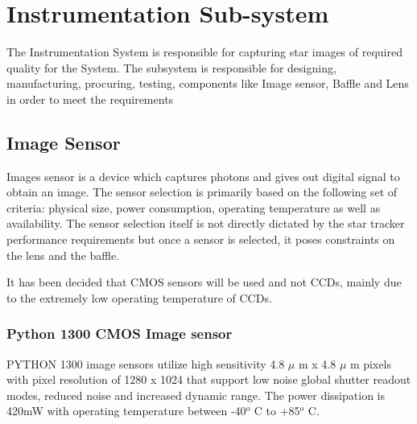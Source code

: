 \chapter{Instrumentation Sub-system}
\thispagestyle{fancy}

%
%
%
%




The Instrumentation System is responsible for capturing star images of required quality for the System. The subsystem is responsible for designing, manufacturing, procuring, testing, components like Image sensor, Baffle and Lens in order to meet the requirements 

\section{Image Sensor}
Images sensor is a device which captures photons and gives out digital signal to obtain an image.
The sensor selection is primarily based on the following set of criteria: physical size, power consumption, operating temperature as well as availability. The sensor selection itself is not directly dictated by the star tracker performance requirements but once a sensor is selected, it poses constraints on the lens and the baffle. \par It has been decided that CMOS sensors will be used and not CCDs, mainly due to the extremely low operating temperature of CCDs.

\subsection{Python 1300 CMOS Image sensor}
PYTHON 1300 image sensors utilize high sensitivity 4.8 $\mu$ m x 4.8 $\mu$ m pixels with pixel resolution of 1280 x 1024 that support low noise global shutter readout modes, reduced noise and increased dynamic range. The power dissipation is 420mW with operating temperature between -40$^o$ C to +85$^o$ C.


